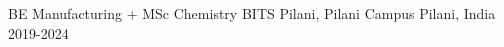 

\begin{cventriesx}
  \cventryx
    {BE Manufacturing + MSc Chemistry} %
    {BITS Pilani, Pilani Campus} %
    {Pilani, India} %
    {2019-2024} %
    
    
\end{cventriesx}
